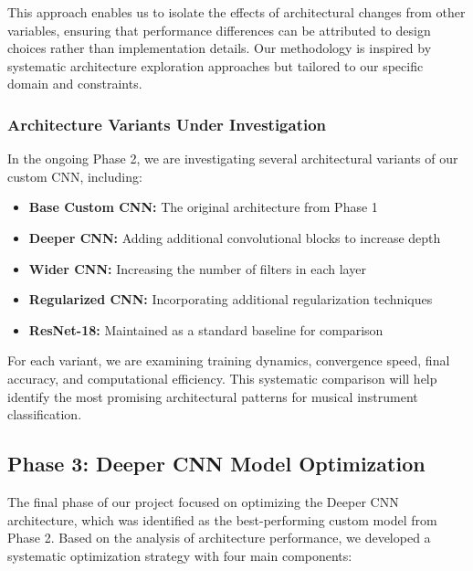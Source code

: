 This approach enables us to isolate the effects of architectural changes from other variables, ensuring that performance differences can be attributed to design choices rather than implementation details. Our methodology is inspired by systematic architecture exploration approaches \cite{zoph2018learning, tan2019efficientnet} but tailored to our specific domain and constraints.

\subsubsection{Architecture Variants Under Investigation}
In the ongoing Phase 2, we are investigating several architectural variants of our custom CNN, including:
\begin{itemize}
    \item \textbf{Base Custom CNN:} The original architecture from Phase 1
    \item \textbf{Deeper CNN:} Adding additional convolutional blocks to increase depth
    \item \textbf{Wider CNN:} Increasing the number of filters in each layer
    \item \textbf{Regularized CNN:} Incorporating additional regularization techniques
    \item \textbf{ResNet-18:} Maintained as a standard baseline for comparison
\end{itemize}

For each variant, we are examining training dynamics, convergence speed, final accuracy, and computational efficiency. This systematic comparison will help identify the most promising architectural patterns for musical instrument classification.


\subsection{Phase 3: Deeper CNN Model Optimization}
The final phase of our project focused on optimizing the Deeper CNN architecture, which was identified as the best-performing custom model from Phase 2. Based on the analysis of architecture performance, we developed a systematic optimization strategy with four main components:

